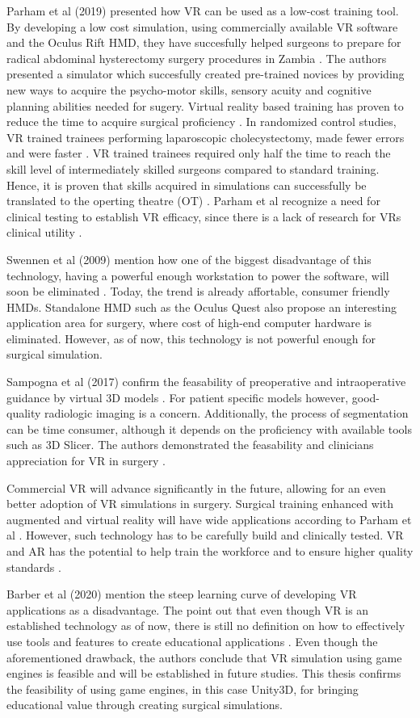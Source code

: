Parham et al (2019) presented how VR can be used as a low-cost training tool.
By developing a low cost simulation, using commercially available VR software and the Oculus Rift HMD, they have succesfully helped surgeons to prepare for radical abdominal hysterectomy surgery procedures in Zambia \cite{Parham.2019}.
The authors presented a simulator which succesfully created pre-trained novices by providing new ways to acquire the psycho-motor skills, sensory acuity and cognitive planning abilities needed for sugery.
Virtual reality based training has proven to reduce the time to acquire surgical proficiency \cite{RN61,RN62}. 
In randomized control studies, VR trained trainees performing laparoscopic cholecystectomy, made fewer errors and were faster \cite{RN63,RN64}.
VR trained trainees required only half the time to reach the skill level of intermediately skilled surgeons compared to standard training.
Hence, it is proven that skills acquired in simulations can successfully be translated to the operting theatre (OT) \cite{RN63,RN64}.
Parham et al recognize a need for clinical testing to establish VR efficacy, since there is a lack of research for VRs clinical utility \cite{RN59}. 

Swennen et al (2009) mention how one of the biggest disadvantage of this technology, having a powerful enough workstation to power the software, will soon be eliminated \cite{swennen2009three}.
Today, the trend is already  affortable, consumer friendly HMDs.
Standalone HMD such as the Oculus Quest also propose an interesting application area for surgery, where cost of high-end computer hardware is eliminated. 
However, as of now, this technology is not powerful enough for surgical simulation.

Sampogna et al (2017) confirm the feasability of preoperative and intraoperative guidance by virtual 3D models \cite{Sampogna.2017}.
For patient specific models however, good-quality radiologic imaging is a concern.
Additionally, the process of segmentation can be time consumer, although it depends on the proficiency with available tools such as 3D Slicer.
The authors demonstrated the feasability and clinicians appreciation for VR in surgery \cite{Sampogna.2017}.

Commercial VR will advance significantly in the future, allowing for an even better adoption of VR simulations in surgery.
Surgical training enhanced with augmented and virtual reality will have wide applications according to Parham et al \cite{RN61,RN62}.
However, such technology has to be carefully build and clinically tested.
VR and AR has the potential to help train the workforce and to ensure higher quality standards \cite{RN52}.

Barber et al (2020) mention the steep learning curve of developing VR applications as a disadvantage.
The point out that even though VR is an established technology as of now, there is still no definition on how to effectively use tools and features to create educational applications \cite{Barber.2020}.
Even though the aforementioned drawback, the authors conclude that VR simulation using game engines is feasible and will be established in future studies.
This thesis confirms the feasibility of using game engines, in this case Unity3D, for bringing educational value through creating surgical simulations.